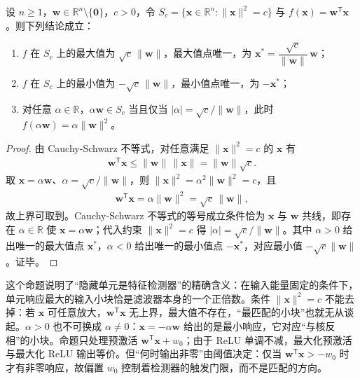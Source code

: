 \documentclass[../../main.tex]{subfiles}
\begin{document}
\begin{proposition}[最大响应方向]\label{proposition:ch10-最大响应方向}
设 $n\geqslant1$，$\mathbf{w}\in\mathbb{R}^{n}\setminus\{\mathbf{0}\}$，$c>0$，令
$S_c=\{\mathbf{x}\in\mathbb{R}^{n}:\|\mathbf{x}\|^{2}=c\}$ 与
$f(\mathbf{x})=\mathbf{w}^{\mathsf{T}}\mathbf{x}$。则下列结论成立：
\begin{enumerate}
  \item $f$ 在 $S_c$ 上的最大值为 $\sqrt{c}\,\|\mathbf{w}\|$，最大值点唯一，为
        $\mathbf{x}^{\ast}=\dfrac{\sqrt{c}}{\|\mathbf{w}\|}\,\mathbf{w}$；
  \item $f$ 在 $S_c$ 上的最小值为 $-\sqrt{c}\,\|\mathbf{w}\|$，最小值点唯一，为
        $-\mathbf{x}^{\ast}$；
  \item 对任意 $\alpha\in\mathbb{R}$，$\alpha\mathbf{w}\in S_c$ 当且仅当
        $|\alpha|=\sqrt{c}/\|\mathbf{w}\|$，此时
        $f(\alpha\mathbf{w})=\alpha\|\mathbf{w}\|^{2}$。
\end{enumerate}
\end{proposition}
\begin{proof}
由 Cauchy-Schwarz 不等式，对任意满足 $\|\mathbf{x}\|^2=c$ 的 $\mathbf{x}$ 有
\begin{align*}
  \mathbf{w}^{\mathsf{T}}\mathbf{x}\leqslant \|\mathbf{w}\|\,\|\mathbf{x}\|=\|\mathbf{w}\|\sqrt{c}.
\end{align*}
取 $\mathbf{x}=\alpha\mathbf{w}$、$\alpha=\sqrt{c}/\|\mathbf{w}\|$，则 $\|\mathbf{x}\|^2=\alpha^2\|\mathbf{w}\|^2=c$，且
\begin{align*}
  \mathbf{w}^{\mathsf{T}}\mathbf{x}=\alpha\|\mathbf{w}\|^2=\sqrt{c}\,\|\mathbf{w}\|,
\end{align*}
故上界可取到。Cauchy-Schwarz 不等式的等号成立条件恰为 $\mathbf{x}$ 与 $\mathbf{w}$ 共线，即存在 $\alpha\in\mathbb{R}$ 使 $\mathbf{x}=\alpha\mathbf{w}$；代入约束 $\|\mathbf{x}\|^2=c$ 得 $|\alpha|=\sqrt{c}/\|\mathbf{w}\|$。其中 $\alpha>0$ 给出唯一的最大值点 $\mathbf{x}^{\ast}$，$\alpha<0$ 给出唯一的最小值点 $-\mathbf{x}^{\ast}$，对应最小值 $-\sqrt{c}\|\mathbf{w}\|$。证毕。
\end{proof}

\begin{remark}
这个命题说明了“隐藏单元是特征检测器”的精确含义：在输入能量固定的条件下，单元响应最大的输入小块恰是滤波器本身的一个正倍数。条件 $\|\mathbf{x}\|^2=c$ 不能去掉：若 $\mathbf{x}$ 可任意放大，$\mathbf{w}^{\mathsf{T}}\mathbf{x}$ 无上界，最大值不存在，“最匹配的小块”也就无从谈起。$\alpha>0$ 也不可换成 $\alpha\neq0$：$\mathbf{x}=-\alpha\mathbf{w}$ 给出的是最小响应，它对应“与核反相”的小块。命题只处理预激活 $\mathbf{w}^{\mathsf{T}}\mathbf{x}+w_0$；由于 ReLU 单调不减，最大化预激活与最大化 ReLU 输出等价。但“何时输出非零”由阈值决定：仅当 $\mathbf{w}^{\mathsf{T}}\mathbf{x}>-w_0$ 时才有非零响应，故偏置 $w_0$ 控制着检测器的触发门限，而不是匹配的方向。
\end{remark}
\end{document}
